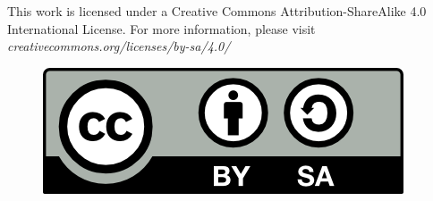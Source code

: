 \documentclass{article}
\begin{document}
        This work is licensed under a Creative Commons Attribution-ShareAlike 4.0 International License. For more information, please visit \textit{creativecommons.org/licenses/by-sa/4.0/}

        \begin{figure}[hbt!]

            \includegraphics[scale = 0.8]{./Images/LICENSE.png}
            \label{fig:LICENSE}
        
        \end{figure}

    \clearpage
\end{document}

